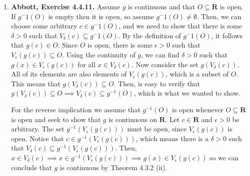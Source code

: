 \documentclass{article}
\DeclarePairedDelimiter\abs{\lvert}{\rvert}
\newcommand{\R}{\mathbf{R}}
\newcommand{\exc}[2][Abbott]{\item \textbf{#1, Exercise #2.}}
\newcommand{\lep}[1][L]{#1et $\epsilon > 0$ be arbitrary}
\begin{document}
\begin{enumerate}
\begin{enumerate}
        \item Set $A := \R$ and $f(x)=g(x) = x$. Both $f$ and $g$ are uniformly continuous on $\R$, but $f(x)g(x) = x^2$ is not.  
        
        \item Set $A := (0, 1)$, $f(x) := 1$ and $g(x) := x$. Then, $f(x)/g(x) = 1/x$, which is not uniformly continuous on $A$ by Exercise 4.4.2 (a). 
        
        \item Set $A := (1, \infty)$, $f(x) := 1/x$ and $g(x) := x-1$. It is easy to verify that both $f$ and $g$ are uniformly continuous on $A$. However, $f(g(x)) = 1/(x-1)$ is not bounded at $A$, so it cannot be uniformly continuous, by Exercise 4.4.4 (b).
        
        \item \lep. Choose $\delta_1 > 0$ such that $\abs{f(x)-f(y)} < \epsilon$ when $\abs{x-y} < \delta_1$. Next, choose $\delta > 0$ such that $\abs{g(x)-g(y)} < \delta_1$ whenever $\abs{x-y} < \delta$. Now let $x,y \in A$ be such that $\abs{x-y} < \delta$. It follows that $\abs{g(x)-g(y)} < \delta_1$. This implies $\abs{f(g(x))-f(g(y))} < \epsilon$, so $f \circ g$ is uniformly continuous on $A$.
    \end{enumerate}
    
    \exc{4.4.11}
    Assume $g$ is continuous and that $O \subseteq \R$ is open. If $g^-1(O)$ is empty then it is open, so assume $g^-1(O) \neq \emptyset$. Then, we can choose some arbitrary $c \in g^-1(O)$, and we need to show that there is some $\delta > 0$ such that $V_{\delta}(c) \subseteq g^{-}1(O)$. By the definition of $g^-1(O)$, it follows that $g(c) \in O$. Since $O$ is open, there is some $\epsilon > 0$ such that $V_\epsilon(g(c)) \subseteq O$. Using the continuity of $g$, we can find $\delta > 0$ such that $g(x) \in V_\epsilon(g(c))$ for all $x \in V_\delta(c)$. Now consider the set $g(V_\delta(c))$. All of its elements are also elements of $V_\epsilon(g(c))$, which is a subset of $O$. This means that $g(V_\delta(c)) \subseteq O$. Then, is easy to verify that $g(V_\delta(c)) \subseteq O \implies V_\delta(c) \subseteq g^{-1}(O)$, which is what we wanted to show.
    
    For the reverse implication we assume that $g^{-1}(O)$ is open whenever $O \subseteq \R$ is open and seek to show that $g$ is continuous on $\R$. Let $c \in \R$ and $\epsilon > 0$ be arbitrary. The set $g^{-1}(V_\epsilon(g(c)))$ must be open, since $V_\epsilon(g(c))$ is open. Notice that $c \in g^{-1}(V_\epsilon(g(c)))$, which means there is a $\delta > 0$ such that $V_\delta(c) \subseteq g^{-1}(V_\epsilon(g(c)))$. Then, $x \in V_\delta(c) \implies x \in g^{-1}(V_\epsilon(g(c))) \implies g(x) \in V_\epsilon(g(c))$ so we can conclude that $g$ is continuous by Theorem 4.3.2 (ii).
    

\end{enumerate}
\end{document}
